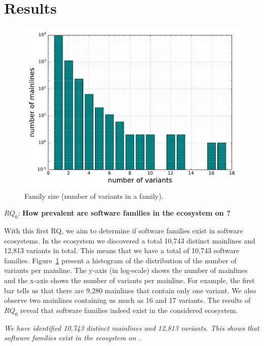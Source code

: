 \section{Results}
\label{sec:results}
\begin{figure}[htbp]
\vspace{-.3cm}
   \centering
    \includegraphics[scale=0.4]{figures/variants.pdf}
    \caption{Family size (number of variants in a family).}
   
    \label{fig:variants}
\end{figure}

\noindent
$RQ_0$: \textbf{How prevalent are software families in the \js ecosystem on \gh?}

With this first RQ, we aim to determine if software families exist in software ecosystems. In the \js ecosystem we discovered a total 10,743 distinct mainlines and 12,813 variants in total. This means that we have a total of 10,743 software families. Figure~\ref{fig:variants} present a histogram of the distribution of the number of variants per mainline. The y-axis (in log-scale) shows the number of mainlines and  the x-axis shows the number of variants per mainline. For example, the first bar tells us that there are 9,280 mainlines that contain only one variant. We also observe two mainlines containing us much as 16 and 17 variants. The results of $RQ_0$ reveal that software families indeed exist in the considered ecosystem.%

\begin{framed}
\noindent
\emph{We have identified 10,743 distinct mainlines and 12,813 variants. This shows that software families exist in the \js ecosystem on \gh.}
\end{framed}


